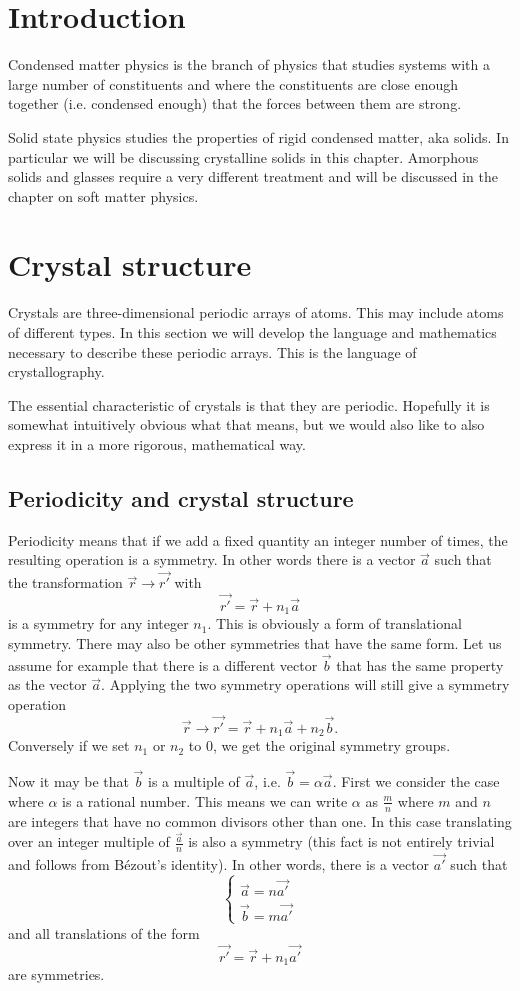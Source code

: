 \chapter{Introduction}
Condensed matter physics is the branch of physics that studies systems with a large number of constituents and where the constituents are close enough together (i.e. condensed enough) that the forces between them are strong.

Solid state physics studies the properties of rigid condensed matter, aka solids. In particular we will be discussing crystalline solids in this chapter. Amorphous solids and glasses require a very different treatment and will be discussed in the chapter on soft matter physics.
\chapter{Crystal structure}
Crystals are three-dimensional periodic arrays of atoms. This may include atoms of different types. In this section we will develop the language and mathematics necessary to describe these periodic arrays. This is the language of crystallography.

The essential characteristic of crystals is that they are periodic. Hopefully it is somewhat intuitively obvious what that means, but we would also like to also express it in a more rigorous, mathematical way.

\section{Periodicity and crystal structure}

Periodicity means that if we add a fixed quantity an integer number of times, the resulting operation is a symmetry. In other words there is a vector $\vec{a}$ such that the transformation $\vec{r} \to \vec{r'}$ with
\[ \vec{r'} = \vec{r} + n_1\vec{a} \]
is a symmetry for any integer $n_1$. This is obviously a form of translational symmetry. There may also be other symmetries that have the same form. Let us assume for example that there is a different vector $\vec{b}$ that has the same property as the vector $\vec{a}$. Applying the two symmetry operations will still give a symmetry operation
\[ \vec{r} \to \vec{r'} = \vec{r} + n_1 \vec{a} + n_2 \vec{b}. \]
Conversely if we set $n_1$ or $n_2$ to $0$, we get the original symmetry groups.

Now it may be that $\vec{b}$ is a multiple of $\vec{a}$, i.e. $\vec{b} = \alpha \vec{a}$. First we consider the case where $\alpha$ is a rational number. This means we can write $\alpha$ as $\frac{m}{n}$ where $m$ and $n$ are integers that have no common divisors other than one. In this case translating over an integer multiple of $\frac{\vec{a}}{n}$ is also a symmetry (this fact is not entirely trivial and follows from Bézout's identity). In other words, there is a vector $\vec{a'}$ such that
\[ \begin{cases}
\vec{a} = n \vec{a'} \\
\vec{b} = m \vec{a'}
\end{cases} \]
and all translations of the form
\[ \vec{r'} = \vec{r} + n_1\vec{a'} \]
are symmetries.

